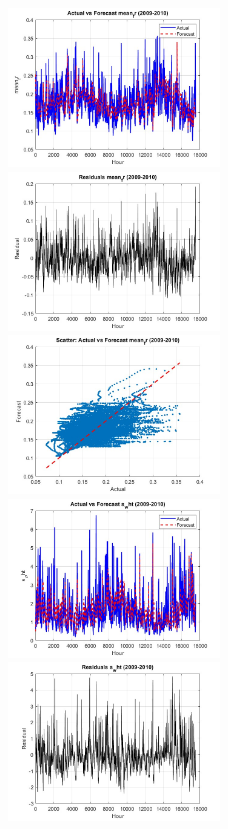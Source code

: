 \begin{figure}[ht!]
    \centering
    \includegraphics[width=0.5\textwidth]{"graphs/lstm/mean_fr/actual vs forecast.jpg"}\hfill
    \includegraphics[width=0.5\textwidth]{"graphs/lstm/mean_fr/residuals.jpg"}\\[1ex]
    \includegraphics[width=0.5\textwidth]{"graphs/lstm/mean_fr/scatter plot.jpg"}\hfill
    \includegraphics[width=0.5\textwidth]{"graphs/lstm/s_wht/actual vs forecast.jpg"}\\[1ex]
    \includegraphics[width=0.5\textwidth]{"graphs/lstm/s_wht/residuals.jpg"}\hfill

\end{figure}
